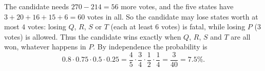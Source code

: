 The candidate needs $270-214=56$ more votes, and the five states have $3+20+16+15+6=60$ votes in all. So the candidate may lose states worth at most $4$ votes: losing $Q$, $R$, $S$ or $T$ (each at least $6$ votes) is fatal, while losing $P$ ($3$ votes) is allowed. Thus the candidate wins exactly when $Q$, $R$, $S$ and $T$ are all won, whatever happens in $P$. By independence the probability is
\[0.8\cdot0.75\cdot0.5\cdot0.25=\dfrac45\cdot\dfrac34\cdot\dfrac12\cdot\dfrac14=\boxed{\dfrac{3}{40}}=7.5\%.\]

